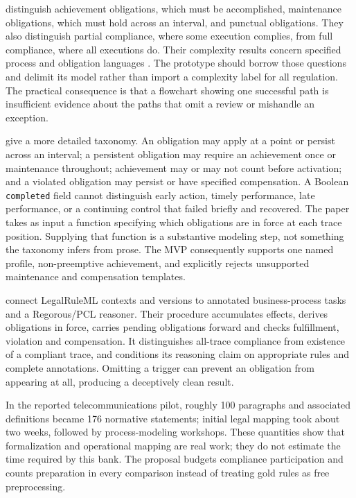 \citet[sec.~2]{compliancehard2015} distinguish achievement obligations, which must
be accomplished, maintenance obligations, which must hold across an interval,
and punctual obligations. They also distinguish partial compliance, where some
execution complies, from full compliance, where all executions do. Their
complexity results concern specified process and obligation languages
\citep[secs.~3--4]{compliancehard2015}. The prototype should borrow those questions
and delimit its model rather than import a complexity label for all regulation.
The practical consequence is that a flowchart showing one successful path is
insufficient evidence about the paths that omit a review or mishandle an exception.

\citet[sec.~3, Definitions 10--17]{normative2016} give a more detailed taxonomy.
An obligation may apply at a point or persist across an interval; a persistent
obligation may require an achievement once or maintenance throughout; achievement
may or may not count before activation; and a violated obligation may persist or
have specified compensation. A Boolean \texttt{completed} field cannot distinguish
early action, timely performance, late performance, or a continuing control that
failed briefly and recovered. The paper takes as input a function specifying
which obligations are in force at each trace position. Supplying that function
is a substantive modeling step, not something the taxonomy infers from prose.
The MVP consequently supports one named profile, non-preemptive achievement,
and explicitly rejects unsupported maintenance and compensation templates.

\citet[secs.~3--4]{semanticcompliance2016} connect LegalRuleML contexts and
versions to annotated business-process tasks and a Regorous/PCL reasoner. Their
procedure accumulates effects, derives obligations in force, carries pending
obligations forward and checks fulfillment, violation and compensation. It
distinguishes all-trace compliance from existence of a compliant trace, and
conditions its reasoning claim on appropriate rules and complete annotations.
Omitting a trigger can prevent an obligation from appearing at all, producing a
deceptively clean result.

In the reported telecommunications pilot, roughly 100 paragraphs and associated
definitions became 176 normative statements; initial legal mapping took about
two weeks, followed by process-modeling workshops. These quantities show that
formalization and operational mapping are real work; they do not estimate the
time required by this bank. The proposal budgets compliance participation and
counts preparation in every comparison instead of treating gold rules as free
preprocessing.

